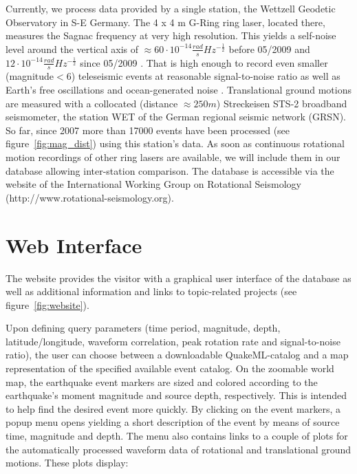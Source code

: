 \documentclass[12pt,reqno,letter]{article}
\begin{document}
Currently, we process data provided by a single station, the Wettzell Geodetic Observatory in S-E Germany. The 4 x 4 m G-Ring ring laser, located there, measures the Sagnac frequency at very high resolution. This yields a self-noise level around the vertical axis of $\approx60\cdot10^{-14}\frac{rad}{s}Hz^{-\frac{1}{2}}$ before 05/2009 and $12\cdot10^{-14}\frac{rad}{s}Hz^{-\frac{1}{2}}$ since 05/2009 \citep{Schreiber2013}. That is high enough to record even smaller (magnitude$<$6) teleseismic events at reasonable signal-to-noise ratio as well as Earth's free oscillations \citep{Igel2011} and ocean-generated noise \citep{Hadziioannou2012}.
Translational ground motions are measured with a collocated (distance $\approx250m$) Streckeisen STS-2 broadband seismometer, the station WET of the German regional seismic network (GRSN). So far, since 2007 more than 17000 events have been processed (see figure~\ref{fig:mag_dist}) using this station's data. As soon as continuous rotational motion recordings of other ring lasers are available, we will include them in our database allowing inter-station comparison. The database is accessible via the website of the International Working Group on Rotational Seismology (http://www.rotational-seismology.org).\\
%
%
\section*{Web Interface}
\label{sec:website}
The website provides the visitor with a graphical user interface of the database as well as additional information and links to topic-related projects (see figure~\ref{fig:website}).

Upon defining query parameters (time period, magnitude, depth, latitude/longitude, waveform correlation, peak rotation rate and signal-to-noise ratio), the user can choose between a downloadable QuakeML-catalog and a map representation of the specified available event catalog. On the zoomable world map, the earthquake event markers are sized and colored according to the earthquake’s moment magnitude and source depth, respectively. This is intended to help find the desired event more quickly.
By clicking on the event markers, a popup menu opens yielding a short description of the event by means of source time, magnitude and depth. The menu also contains links to a couple of plots for the automatically processed waveform data of rotational and translational ground motions. These plots display:
\end{document}
